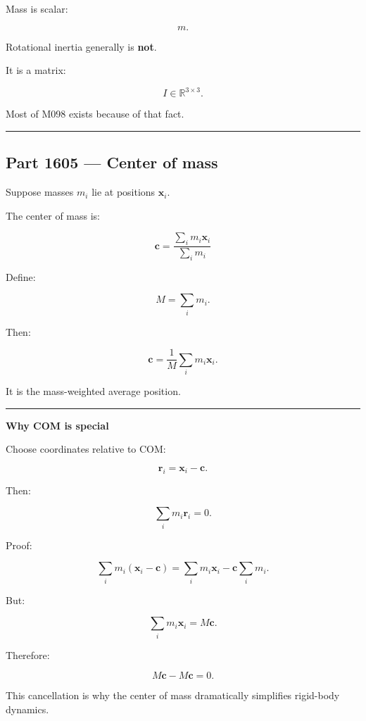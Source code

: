 Mass is scalar:

\[
m.
\]

Rotational inertia generally is \textbf{not}.

It is a matrix:

\[
I\in\mathbb{R}^{3\times3}.
\]

Most of M098 exists because of that fact.

\begin{center}\rule{0.5\linewidth}{0.5pt}\end{center}

\subsection{Part 1605 --- Center of mass}\label{06-engine-ii-ch034-part-1605-center-of-mass}

\hypertarget{06-engine-ii-ch034-part-1605-center-of-mass}{}

Suppose masses \(m_i\) lie at positions \(\mathbf{x}_i\).

The center of mass is:

\[
\boxed{
\mathbf{c}
=
\frac{\sum_i m_i\mathbf{x}_i}
{\sum_i m_i}
}
\]

Define:

\[
M=\sum_i m_i.
\]

Then:

\[
\mathbf{c}
=
\frac{1}{M}
\sum_i
m_i\mathbf{x}_i.
\]

It is the mass-weighted average position.

\begin{center}\rule{0.5\linewidth}{0.5pt}\end{center}

\textbf{Why COM is special}

Choose coordinates relative to COM:

\[
\mathbf{r}_i
=
\mathbf{x}_i-\mathbf{c}.
\]

Then:

\[
\sum_i m_i\mathbf{r}_i
=
0.
\]

Proof:

\[
\sum_i m_i(\mathbf{x}_i-\mathbf{c})
=
\sum_i m_i\mathbf{x}_i
-
\mathbf{c}\sum_i m_i.
\]

But:

\[
\sum_i m_i\mathbf{x}_i
=
M\mathbf{c}.
\]

Therefore:

\[
M\mathbf{c}-M\mathbf{c}=0.
\]

This cancellation is why the center of mass dramatically simplifies rigid-body dynamics.

